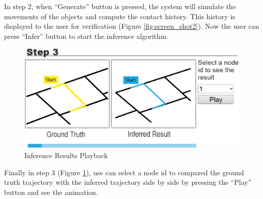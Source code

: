 In step 2, when ``Generate'' button is pressed, 
the system will simulate the movements of the objects and 
compute the contact history. This history is displayed to the user for 
verification (Figure \ref{fig:screen_shot2}).  
Now the user can press ``Infer'' button to start the inference
algorithm.

\begin{figure}[th]
\centering
\includegraphics[scale=0.25]{screenShot3_2.eps}
\caption{Inference Results Playback}
\label{fig:screen_shot3}
\end{figure}

Finally in step 3 (Figure \ref{fig:screen_shot3}), use can select a node id
to compared the ground truth trajectory with the inferred trajectory side by
side by pressing the ``Play'' button and see the animation.

%


